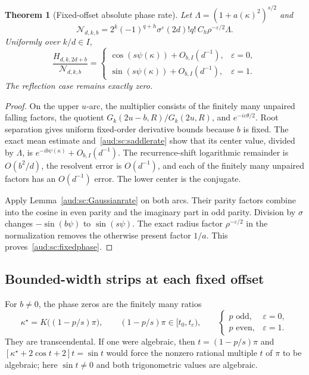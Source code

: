 \documentclass[11pt,a4paper]{article}
\numberwithin{equation}{section}
\newtheorem{theorem}{Theorem}[section]
\begin{document}
\begin{theorem}[Fixed-offset absolute phase rate]\label{aud:sc:fixedrate}
Let $\Lambda=(1+a(\kappa)^2)^{s/2}$ and
\[
 \mathcal N_{d,k,b}
 =2^k(-1)^{q+h}\sigma^\varepsilon(2d)!q!\,
 C_h\rho^{-\varepsilon/2}\Lambda.
\]
Uniformly over $k/d\in I$,
\begin{equation}\label{aud:sc:fixedphase}
 \frac{H_{d,k,2d+b}}{\mathcal N_{d,k,b}}
 =\begin{cases}
 \cos(s\psi(\kappa))+O_{b,I}(d^{-1}),&\varepsilon=0,\\
 \sin(s\psi(\kappa))+O_{b,I}(d^{-1}),&\varepsilon=1.
 \end{cases}
\end{equation}
The reflection case remains exactly zero.
\end{theorem}
\begin{proof}
On the upper $u$-arc, the multiplier consists of the finitely many unpaired falling factors, the quotient $G_k(2u-b,R)/G_k(2u,R)$, and $e^{-i\varepsilon\theta/2}$. Root separation gives uniform fixed-order derivative bounds because $b$ is fixed. The exact mean estimate and~\eqref{aud:sc:saddlerate} show that its center value, divided by $\Lambda$, is
$e^{-ib\psi(\kappa)}+O_{b,I}(d^{-1})$. The recurrence-shift logarithmic remainder is $O(b^2/d)$, the resolvent error is $O(d^{-1})$, and each of the finitely many unpaired factors has an $O(d^{-1})$ error. The lower center is the conjugate.

Apply Lemma~\ref{aud:sc:Gaussianrate} on both arcs. Their parity factors combine into the cosine in even parity and the imaginary part in odd parity. Division by $\sigma$ changes $-\sin(b\psi)$ to $\sin(s\psi)$. The exact radius factor $\rho^{-\varepsilon/2}$ in the normalization removes the otherwise present factor $1/a$. This proves~\eqref{aud:sc:fixedphase}.
\end{proof}

\subsection{Bounded-width strips at each fixed offset}
For $b\ne0$, the phase zeros are the finitely many ratios
\begin{equation}\label{aud:sc:zeroratios}
 \kappa^\star=K\bigl((1-p/s)\pi\bigr),\qquad
 (1-p/s)\pi\in[t_0,t_c),
 \qquad
 \begin{cases}p\text{ odd},&\varepsilon=0,\\p\text{ even},&\varepsilon=1.
 \end{cases}
\end{equation}
They are transcendental. If one were algebraic, then $t=(1-p/s)\pi$ and
$[\kappa^\star+2\cos t+2]t=\sin t$ would force the nonzero rational multiple $t$ of $\pi$ to be algebraic; here $\sin t\ne0$ and both trigonometric values are algebraic.
\end{document}
